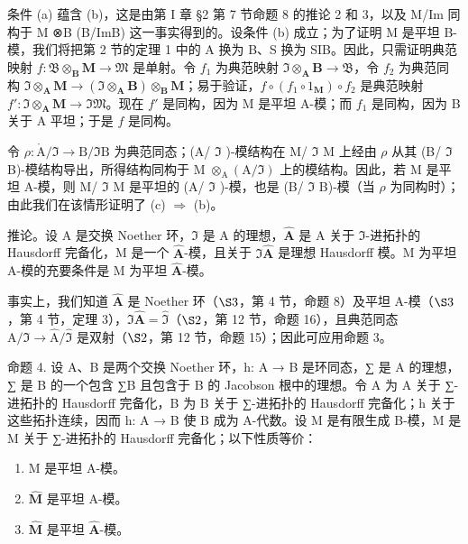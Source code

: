 条件 (a) 蕴含 (b)，这是由第 I 章 §2 第 7 节命题 8 的推论 2 和 3，以及 M/Im 同构于 M ⊗B (B/ImB) 这一事实得到的。设条件 (b) 成立；为了证明 M 是平坦 B-模，我们将把第 2 节的定理 1 中的 A 换为 B、S 换为 SIB。因此，只需证明典范映射 \(f\colon \mathfrak{B} \otimes_{\mathbf{B}} \mathbf{M} \to \mathfrak{M}\) 是单射。令 \(f_1\) 为典范映射 \(\mathfrak{I} \otimes_{\mathbf{A}} \mathbf{B} \to \mathfrak{B}\)，令 \(f_2\) 为典范同构 \(\mathfrak{I} \otimes_{\mathbf{A}} \mathbf{M} \to (\mathfrak{I} \otimes_{\mathbf{A}} \mathbf{B}) \otimes_{\mathbf{B}} \mathbf{M}\)；易于验证，\(f \circ (f_1 \circ 1_{\mathbf{M}}) \circ f_2\) 是典范映射 \(f'\colon \mathfrak{I} \otimes_{\mathbf{A}} \mathbf{M} \to \mathfrak{IM}\)。现在 \(f'\) 是同构，因为 M 是平坦 A-模；而 \(f_1\) 是同构，因为 B 关于 A 平坦；于是 \(f\) 是同构。

令 \(\rho: \mathring{\mathrm{A}}/\mathfrak{I} \to \mathrm{B}/\mathfrak{I}\mathrm{B}\) 为典范同态；(A/ \(\mathfrak{I}\) )-模结构在 M/ \(\mathfrak{I}\) M 上经由 \(\rho\) 从其 (B/ \(\mathfrak{I}\) B)-模结构导出，所得结构同构于 M \(\otimes_{\mathrm{A}} (\mathrm{A}/\mathfrak{I})\) 上的模结构。因此，若 M 是平坦 A-模，则 M/ \(\mathfrak{I}\) M 是平坦的 (A/ \(\mathfrak{I}\) )-模，也是 (B/ \(\mathfrak{I}\) B)-模（当 \(\rho\) 为同构时）；由此我们在该情形证明了 (c) \(\Rightarrow\) (b)。

推论。设 A 是交换 Noether 环，\(\Im\) 是 A 的理想，\(\hat{\mathbf{A}}\) 是 A 关于 \(\Im\)-进拓扑的 Hausdorff 完备化，M 是一个 \(\hat{\mathbf{A}}\)-模，且关于 \(\Im\hat{\mathbf{A}}\) 是理想 Hausdorff 模。M 为平坦 A-模的充要条件是 M 为平坦 \(\hat{\mathbf{A}}\)-模。

事实上，我们知道 \(\hat{\mathbf{A}}\) 是 Noether 环（\(\S 3\)，第 4 节，命题 8）及平坦 A-模（\(\S 3\)，第 4 节，定理 3），\(\Im \hat{\mathbf{A}} = \hat{\mathfrak{I}}\)（\(\S 2\)，第 12 节，命题 16），且典范同态 \(\mathrm{A} / \Im \to \hat{\mathrm{A}} / \hat{\mathfrak{I}}\) 是双射（\(\S 2\)，第 12 节，命题 15）；因此可应用命题 3。

命题 4. 设 A、B 是两个交换 Noether 环，h: A → B 是环同态，∑ 是 A 的理想，∑ 是 B 的一个包含 ∑B 且包含于 B 的 Jacobson 根中的理想。令 A 为 A 关于 ∑-进拓扑的 Hausdorff 完备化，B 为 B 关于 ∑-进拓扑的 Hausdorff 完备化；h 关于这些拓扑连续，因而 h: A → B 使 B 成为 A-代数。设 M 是有限生成 B-模，M 是 M 关于 ∑-进拓扑的 Hausdorff 完备化；以下性质等价：

\begin{enumerate}
\def\labelenumi{(\alph{enumi})}
\item
  M 是平坦 A-模。
\item
  \(\hat{\mathbf{M}}\) 是平坦 A-模。
\item
  \(\hat{\mathbf{M}}\) 是平坦 \(\hat{\mathbf{A}}\)-模。
\end{enumerate}


